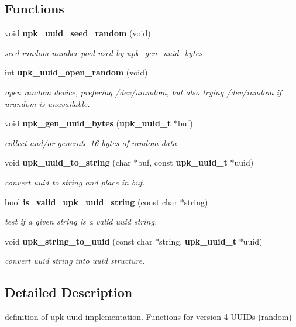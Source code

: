\subsection*{Functions}
\begin{DoxyCompactItemize}
\item 
void {\bf upk\_\-uuid\_\-seed\_\-random} (void)
\begin{DoxyCompactList}\small\item\em seed random number pool used by upk\_\-gen\_\-uuid\_\-bytes. \end{DoxyCompactList}\item 
int {\bf upk\_\-uuid\_\-open\_\-random} (void)
\begin{DoxyCompactList}\small\item\em open random device, prefering /dev/urandom, but also trying /dev/random if urandom is unavailable. \end{DoxyCompactList}\item 
void {\bf upk\_\-gen\_\-uuid\_\-bytes} ({\bf upk\_\-uuid\_\-t} $\ast$buf)
\begin{DoxyCompactList}\small\item\em collect and/or generate 16 bytes of random data. \end{DoxyCompactList}\item 
void {\bf upk\_\-uuid\_\-to\_\-string} (char $\ast$buf, const {\bf upk\_\-uuid\_\-t} $\ast$uuid)
\begin{DoxyCompactList}\small\item\em convert uuid to string and place in buf. \end{DoxyCompactList}\item 
bool {\bf is\_\-valid\_\-upk\_\-uuid\_\-string} (const char $\ast$string)
\begin{DoxyCompactList}\small\item\em test if a given string is a valid uuid string. \end{DoxyCompactList}\item 
void {\bf upk\_\-string\_\-to\_\-uuid} (const char $\ast$string, {\bf upk\_\-uuid\_\-t} $\ast$uuid)
\begin{DoxyCompactList}\small\item\em convert uuid string into uuid structure. \end{DoxyCompactList}\end{DoxyCompactItemize}


\subsection{Detailed Description}
definition of upk uuid implementation. Functions for version 4 UUIDs (random) 